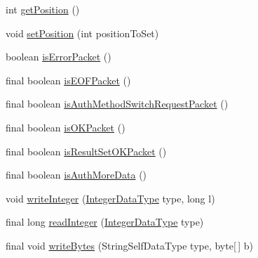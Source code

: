 \begin{DoxyCompactItemize}
\item 
int \mbox{\hyperlink{classcom_1_1mysql_1_1cj_1_1protocol_1_1a_1_1_native_packet_payload_a89ff1dc3fa0998b1362a9fc2351d6797}{get\+Position}} ()
\item 
void \mbox{\hyperlink{classcom_1_1mysql_1_1cj_1_1protocol_1_1a_1_1_native_packet_payload_aa6b85c7f35aa9286b9b6f462dd82623d}{set\+Position}} (int position\+To\+Set)
\item 
boolean \mbox{\hyperlink{classcom_1_1mysql_1_1cj_1_1protocol_1_1a_1_1_native_packet_payload_a4367996e181d7956f2b586c27f1c04ee}{is\+Error\+Packet}} ()
\item 
final boolean \mbox{\hyperlink{classcom_1_1mysql_1_1cj_1_1protocol_1_1a_1_1_native_packet_payload_aebc952e2498deecf37b0b02c313b7bb8}{is\+E\+O\+F\+Packet}} ()
\item 
final boolean \mbox{\hyperlink{classcom_1_1mysql_1_1cj_1_1protocol_1_1a_1_1_native_packet_payload_aa4a35c30b6d281a9aace69b8c2996432}{is\+Auth\+Method\+Switch\+Request\+Packet}} ()
\item 
final boolean \mbox{\hyperlink{classcom_1_1mysql_1_1cj_1_1protocol_1_1a_1_1_native_packet_payload_a0636ef9a0086c5caef961b567fd92f80}{is\+O\+K\+Packet}} ()
\item 
final boolean \mbox{\hyperlink{classcom_1_1mysql_1_1cj_1_1protocol_1_1a_1_1_native_packet_payload_a0066c5b03b5cb03b5178a6927b9b32ee}{is\+Result\+Set\+O\+K\+Packet}} ()
\item 
final boolean \mbox{\hyperlink{classcom_1_1mysql_1_1cj_1_1protocol_1_1a_1_1_native_packet_payload_a54b7b6f463139cb3d33d84212db442d3}{is\+Auth\+More\+Data}} ()
\item 
void \mbox{\hyperlink{classcom_1_1mysql_1_1cj_1_1protocol_1_1a_1_1_native_packet_payload_ad9d225e02fbb482471592f99b5a16958}{write\+Integer}} (\mbox{\hyperlink{enumcom_1_1mysql_1_1cj_1_1protocol_1_1a_1_1_native_constants_1_1_integer_data_type}{Integer\+Data\+Type}} type, long l)
\item 
final long \mbox{\hyperlink{classcom_1_1mysql_1_1cj_1_1protocol_1_1a_1_1_native_packet_payload_a1e4284bb772c7244ad163927017f13dc}{read\+Integer}} (\mbox{\hyperlink{enumcom_1_1mysql_1_1cj_1_1protocol_1_1a_1_1_native_constants_1_1_integer_data_type}{Integer\+Data\+Type}} type)
\item 
final void \mbox{\hyperlink{classcom_1_1mysql_1_1cj_1_1protocol_1_1a_1_1_native_packet_payload_add0512948b6c89c36d0e88b75666e181}{write\+Bytes}} (String\+Self\+Data\+Type type, byte\mbox{[}$\,$\mbox{]} b)
\item 

\end{DoxyCompactItemize}
